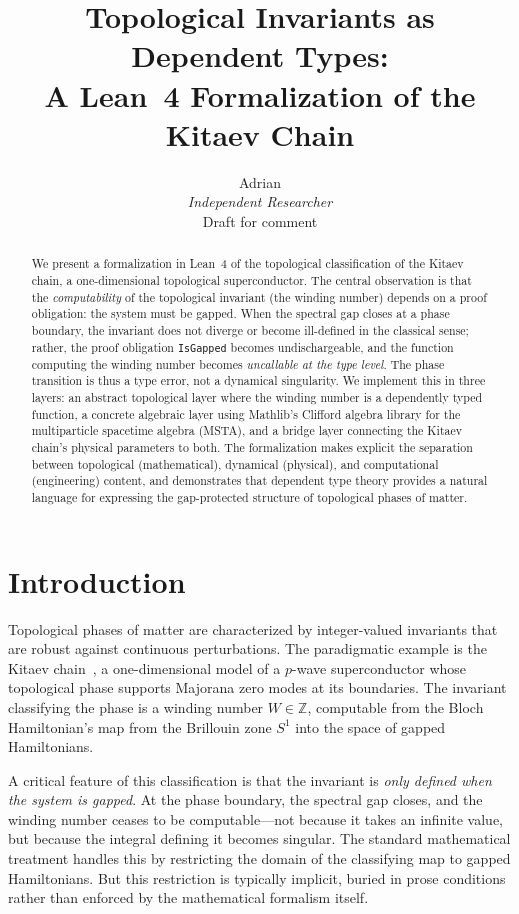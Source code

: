 \documentclass[11pt,a4paper]{article}
\title{\textbf{Topological Invariants as Dependent Types:\\A Lean~4 Formalization of the Kitaev Chain}}
\author{Adrian\\[0.5em]
\textit{Independent Researcher}\\[0.3em]
{\small Draft for comment}}
\date{}
\newcommand{\lean}[1]{\lstinline[language=Lean4]{#1}}
\begin{document}
\maketitle

\begin{abstract}
We present a formalization in Lean~4 of the topological classification of the Kitaev chain, a one-dimensional topological superconductor. The central observation is that the \emph{computability} of the topological invariant (the winding number) depends on a proof obligation: the system must be gapped. When the spectral gap closes at a phase boundary, the invariant does not diverge or become ill-defined in the classical sense; rather, the proof obligation \lean{IsGapped} becomes undischargeable, and the function computing the winding number becomes \emph{uncallable at the type level}. The phase transition is thus a type error, not a dynamical singularity. We implement this in three layers: an abstract topological layer where the winding number is a dependently typed function, a concrete algebraic layer using Mathlib's Clifford algebra library for the multiparticle spacetime algebra (MSTA), and a bridge layer connecting the Kitaev chain's physical parameters to both. The formalization makes explicit the separation between topological (mathematical), dynamical (physical), and computational (engineering) content, and demonstrates that dependent type theory provides a natural language for expressing the gap-protected structure of topological phases of matter.
\end{abstract}

\section{Introduction}

Topological phases of matter are characterized by integer-valued invariants that are robust against continuous perturbations. The paradigmatic example is the Kitaev chain~\cite{Kitaev2001}, a one-dimensional model of a $p$-wave superconductor whose topological phase supports Majorana zero modes at its boundaries. The invariant classifying the phase is a winding number $W \in \mathbb{Z}$, computable from the Bloch Hamiltonian's map from the Brillouin zone $S^1$ into the space of gapped Hamiltonians.

A critical feature of this classification is that the invariant is \emph{only defined when the system is gapped}. At the phase boundary, the spectral gap closes, and the winding number ceases to be computable---not because it takes an infinite value, but because the integral defining it becomes singular. The standard mathematical treatment handles this by restricting the domain of the classifying map to gapped Hamiltonians. But this restriction is typically implicit, buried in prose conditions rather than enforced by the mathematical formalism itself.
\end{document}
